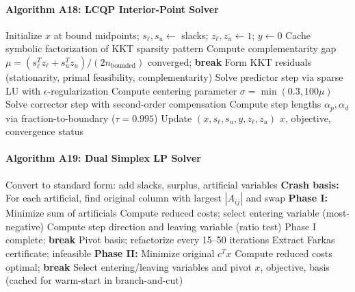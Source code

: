 \paragraph{Algorithm A18: LCQP Interior-Point Solver}
\begin{algorithmic}[1]
  \State Initialize $x$ at bound midpoints; $s_\ell, s_u \gets$ slacks; $z_\ell, z_u \gets 1$; $y \gets 0$
  \State Cache symbolic factorization of KKT sparsity pattern
    \State Compute complementarity gap $\mu = (s_\ell^T z_\ell + s_u^T z_u) / (2n_{\text{bounded}})$
     \State converged; \textbf{break} \EndIf
    \State Form KKT residuals (stationarity, primal feasibility, complementarity)
    \State Solve predictor step via sparse LU with $\epsilon$-regularization
    \State Compute centering parameter $\sigma = \min(0.3, 100\mu)$
    \State Solve corrector step with second-order compensation
    \State Compute step lengths $\alpha_p, \alpha_d$ via fraction-to-boundary ($\tau = 0.995$)
    \State Update $(x, s_\ell, s_u, y, z_\ell, z_u)$
  \EndFor
  \State \Return $x$, objective, convergence status
\EndProcedure
\end{algorithmic}

\paragraph{Algorithm A19: Dual Simplex LP Solver}
\begin{algorithmic}[1]
  \State Convert to standard form: add slacks, surplus, artificial variables
  \State \textbf{Crash basis:} For each artificial, find original column with largest $|A_{ij}|$ and swap
  \State \textbf{Phase I:} Minimize sum of artificials
    \State Compute reduced costs; select entering variable (most-negative)
    \State Compute step direction and leaving variable (ratio test)
     \State Phase I complete; \textbf{break} \EndIf
    \State Pivot basis; refactorize every 15--50 iterations
  \EndFor
   \State Extract Farkas certificate; \Return infeasible \EndIf
  \State \textbf{Phase II:} Minimize original $c^T x$
    \State Compute reduced costs
     \State optimal; \textbf{break} \EndIf
    \State Select entering/leaving variables and pivot
  \EndFor
  \State \Return $x$, objective, basis (cached for warm-start in branch-and-cut)
\EndProcedure
\end{algorithmic}

